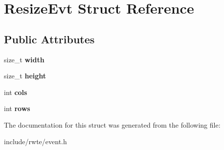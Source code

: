 \hypertarget{structResizeEvt}{}\section{Resize\+Evt Struct Reference}
\label{structResizeEvt}
\subsection*{Public Attributes}
\begin{DoxyCompactItemize}
\item 
\mbox{\label{structResizeEvt_a2d5996573de72a12c14391dcf48262e6}} 
size\+\_\+t {\bfseries width}
\item 
\mbox{\label{structResizeEvt_a0dce1267c2df974482f7c931ab85e3da}} 
size\+\_\+t {\bfseries height}
\item 
\mbox{\label{structResizeEvt_a1aef82aece985f72b0fec2143b1d1d6e}} 
int {\bfseries cols}
\item 
\mbox{\label{structResizeEvt_a6a9525581fe377615070b594e594e35e}} 
int {\bfseries rows}
\end{DoxyCompactItemize}


The documentation for this struct was generated from the following file\+:\begin{DoxyCompactItemize}
\item 
include/rwte/event.\+h\end{DoxyCompactItemize}
